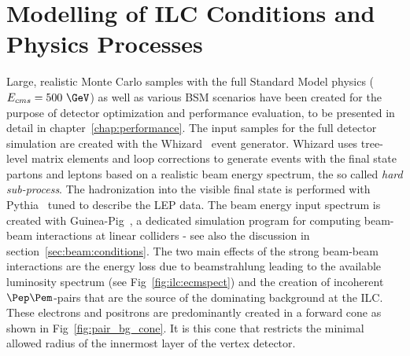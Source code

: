 \section{\label{sec:generator} Modelling of ILC Conditions and Physics Processes}
%
%
Large, realistic Monte Carlo samples with the full Standard Model physics ($E_{cms}=500~\GeV$) as well as various
BSM scenarios have been created for the purpose of detector optimization and performance evaluation, to be presented in detail in
chapter~\ref{chap:performance}. The input samples for the full detector simulation
are created with the Whizard~\cite{Kilian:2007gr} event generator.
Whizard uses tree-level matrix elements and loop corrections to generate events with the final state partons and leptons
based on a realistic beam energy spectrum, the so called \emph{hard sub-process}. The hadronization into the visible final state
is performed with Pythia~\cite{Sjostrand:2006za} tuned to describe the LEP data.
The beam energy input spectrum is created with Guinea-Pig~\cite{Schulte:1998au}, a dedicated simulation program for computing
beam-beam interactions at linear colliders - see also the discussion in section~\ref{sec:beam:conditions}.
The two main effects of the strong beam-beam interactions are the energy loss due to
beamstrahlung leading to the available luminosity spectrum (see Fig~\ref{fig:ilc:ecmspect}) and the creation of
incoherent $\Pep\Pem$-pairs that are the source of the dominating background at the ILC.
These electrons and positrons are predominantly created in a forward cone as shown in Fig~\ref{fig:pair_bg_cone}.
It is this cone that restricts the minimal allowed radius of the innermost layer of the vertex detector.
%
